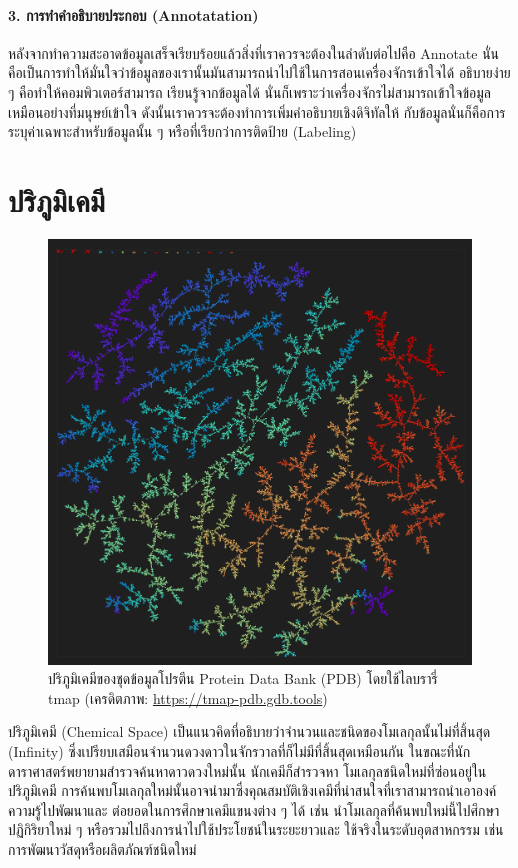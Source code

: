 \paragraph{3. การทำคำอธิบายประกอบ (Annotatation)} หลังจากทำความสะอาดข้อมูลเสร็จเรียบร้อยแล้วสิ่งที่เราควรจะต้องในลำดับต่อไปคือ 
Annotate นั่นคือเป็นการทำให้มั่นใจว่าข้อมูลของเรานั้นมันสามารถนำไปใช้ในการสอนเครื่องจักรเข้าใจได้ อธิบายง่าย ๆ คือทำให้คอมพิวเตอร์สามารถ%
เรียนรู้จากข้อมูลได้ นั่นก็เพราะว่าเครื่องจักรไม่สามารถเข้าใจข้อมูลเหมือนอย่างที่มนุษย์เข้าใจ ดังนั้นเราควรจะต้องทำการเพิ่มคำอธิบายเชิงดิจิทัลให้%
กับข้อมูลนั่นก็คือการระบุค่าเฉพาะสำหรับข้อมูลนั้น ๆ หรือที่เรียกว่าการติดป้าย (Labeling)

\section{ปริภูมิเคมี}
\label{sec:chem_space}

\begin{figure}[htbp]
    \centering
    \includegraphics[width=0.8\linewidth]{fig/peotein_data_bank.png}
    \caption{ปริภูมิเคมีของชุดข้อมูลโปรตีน Protein Data Bank (PDB) โดยใช้ไลบรารี่ tmap 
    (เครดิตภาพ: \url{https://tmap-pdb.gdb.tools})}
    \label{fig:protein_data_bank}
\end{figure}

ปริภูมิเคมี (Chemical Space)\autocite{kirkpatrick2004} เป็นแนวคิดที่อธิบายว่าจำนวนและชนิดของโมเลกุลนั้นไม่ที่สิ้นสุด (Infinity) 
ซึ่งเปรียบเสมือนจำนวนดวงดาวในจักรวาลที่ก็ไม่มีที่สิ้นสุดเหมือนกัน ในขณะที่นักดาราศาสตร์พยายามสำรวจค้นหาดาวดวงใหม่นั้น นักเคมีก็สำรวจหา%
โมเลกุลชนิดใหม่ที่ซ่อนอยู่ในปริภูมิเคมี การค้นพบโมเลกุลใหม่นั้นอาจนำมาซึ่งคุณสมบัติเชิงเคมีที่น่าสนใจที่เราสามารถนำเอาองค์ความรู้ไปพัฒนาและ%
ต่อยอดในการศึกษาเคมีแขนงต่าง ๆ ได้ เช่น นำโมเลกุลที่ค้นพบใหม่นี้ไปศึกษาปฏิกิริยาใหม่ ๆ หรือรวมไปถึงการนำไปใช้ประโยชน์ในระยะยาวและ%
ใช้จริงในระดับอุตสาหกรรม เช่น การพัฒนาวัสดุหรือผลิตภัณฑ์ชนิดใหม่ 


